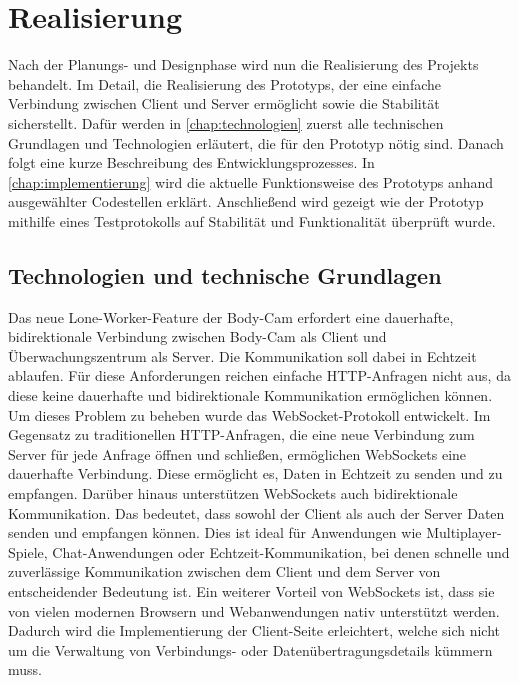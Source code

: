 \documentclass[thesis.tex]{subfiles}
\begin{document}
\chapter{Realisierung}\label{chap:realisierung}

Nach der Planungs- und Designphase wird nun die Realisierung des Projekts behandelt.
Im Detail, die Realisierung des Prototyps, der eine einfache Verbindung zwischen Client und Server ermöglicht sowie die Stabilität sicherstellt.
Dafür werden in \autoref{chap:technologien} zuerst alle technischen Grundlagen und Technologien erläutert, die für den Prototyp nötig sind.
Danach folgt eine kurze Beschreibung des Entwicklungsprozesses.
In \autoref{chap:implementierung} wird die aktuelle Funktionsweise des Prototyps anhand ausgewählter Codestellen erklärt.
Anschließend wird gezeigt wie der Prototyp mithilfe eines Testprotokolls auf Stabilität und Funktionalität überprüft wurde.

\section{Technologien und technische Grundlagen}\label{chap:technologien}

Das neue Lone-Worker-Feature der Body-Cam erfordert eine dauerhafte, bidirektionale Verbindung zwischen Body-Cam als Client und Überwachungszentrum als Server.
Die Kommunikation soll dabei in Echtzeit ablaufen.
Für diese Anforderungen reichen einfache HTTP-Anfragen nicht aus, da diese keine dauerhafte und bidirektionale Kommunikation ermöglichen können.
Um dieses Problem zu beheben wurde das WebSocket-Protokoll entwickelt.
Im Gegensatz zu traditionellen HTTP-Anfragen, die eine neue Verbindung zum Server für jede Anfrage öffnen und schließen, ermöglichen WebSockets eine dauerhafte Verbindung.
Diese ermöglicht es, Daten in Echtzeit zu senden und zu empfangen.
Darüber hinaus unterstützen WebSockets auch bidirektionale Kommunikation.
Das bedeutet, dass sowohl der Client als auch der Server Daten senden und empfangen können.
Dies ist ideal für Anwendungen wie Multiplayer-Spiele, Chat-Anwendungen oder Echtzeit-Kommunikation, bei denen schnelle und zuverlässige Kommunikation zwischen dem Client und dem Server von entscheidender Bedeutung ist.
Ein weiterer Vorteil von WebSockets ist, dass sie von vielen modernen Browsern und Webanwendungen nativ unterstützt werden.
Dadurch wird die Implementierung der Client-Seite erleichtert, welche sich nicht um die Verwaltung von Verbindungs- oder Datenübertragungsdetails kümmern muss. \cite[vgl.~S.~4f][]{WebsocketProtokoll}
\end{document}
